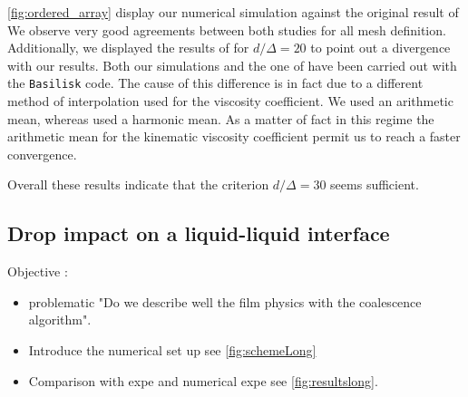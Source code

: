 \ref{fig:ordered_array} display our numerical simulation against the original result of \citet{esmaeeli1999direct}
We observe very good agreements between both studies for all mesh definition.
Additionally, we displayed the results of \citet{innocenti2020direct} for $d/\Delta = 20$ to point out a divergence with our results.  
Both our simulations and the one of \citet{innocenti2020direct} have been carried out with the  \texttt{Basilisk} code. 
The cause of this difference is in fact due to a different method of interpolation used for the viscosity coefficient. 
We used an arithmetic mean, whereas \citet{innocenti2020direct} used a 
harmonic mean. 
As a matter of fact in this regime the arithmetic mean for the kinematic viscosity coefficient permit us to reach a faster convergence. 

Overall these results indicate that the criterion $d/\Delta = 30$ seems sufficient.

\subsection{Drop impact on a liquid-liquid interface}
Objective : 
\begin{itemize}
    \item problematic "Do we describe well the film physics with the coalescence algorithm".
    \item Introduce the numerical set up  see \ref{fig:schemeLong}
    \item Comparison  with expe \citet{mohamed2003drop} and numerical expe \citet{balcazar2015multiple} see \ref{fig:resultslong}.  
\end{itemize}


